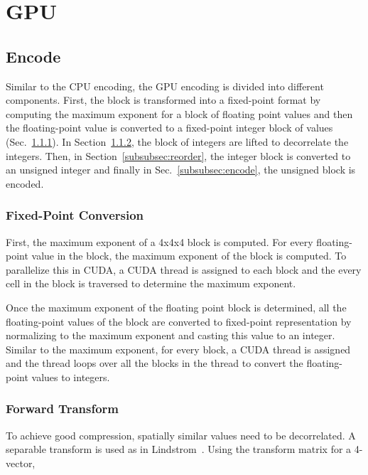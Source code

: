 \documentclass[journal]{vgtc}                %
\begin{document}
\section{GPU}
\subsection{Encode}
Similar to the CPU encoding, the GPU encoding is divided into different components. First, the block is transformed into a fixed-point format by computing the maximum exponent for a block of floating point values and then the floating-point value is converted to a fixed-point integer block of values (Sec.~\ref{subsubsec:fixed}). In Section~\ref{subsubsec:forwardxform}, the block of integers are lifted to decorrelate the integers. Then, in Section~\ref{subsubsec:reorder}, the integer block is converted to an unsigned integer and finally in Sec.~\ref{subsubsec:encode}, the unsigned block is encoded. 

\subsubsection{Fixed-Point Conversion}
\label{subsubsec:fixed}

First, the maximum exponent of a 4x4x4 block is computed. For every floating-point value in the block, the maximum exponent of the block is computed. To parallelize this in CUDA, a CUDA thread is assigned to each block and the every cell in the block is traversed to determine the maximum exponent. 

Once the maximum exponent of the floating point block is determined,
all the floating-point values of the block are converted to fixed-point representation by normalizing to the maximum exponent 
and casting this value to an integer. Similar to the maximum exponent, for every block, a CUDA thread is assigned and the thread loops over all the blocks in the thread to convert the floating-point values to integers.

\subsubsection{Forward Transform}
\label{subsubsec:forwardxform}
To achieve good compression, spatially similar values need to be decorrelated. A separable transform is used as in Lindstrom~\cite{lindstrom:2014}. Using the transform matrix for a 4-vector, 
\end{document}

